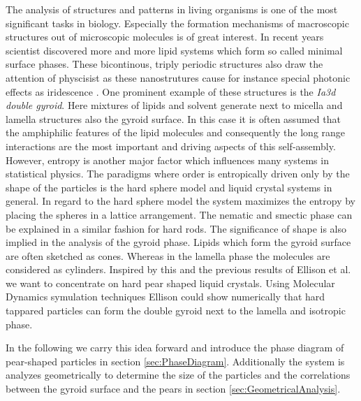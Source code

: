 \documentclass[epj,twocolumn]{webofc}
\begin{document}
The analysis of structures and patterns in living organisms is one of the most significant tasks in biology. Especially the formation mechanisms of macroscopic structures out of microscopic molecules is of great interest. In recent 
years scientist discovered more and more lipid systems which form so called minimal surface phases. These bicontinous, triply periodic structures also draw the attention of physcisist as these nanostrutures cause for instance special 
photonic effects as iridescence \cite{}. One prominent example of these structures is the \textit{Ia3d double gyroid}. Here mixtures of lipids and solvent generate next to micella and lamella structures also the gyroid surface.
In this case it is often assumed that the amphiphilic features of the lipid molecules and consequently the long range interactions are the most important and driving aspects of this self-assembly. However, entropy is another major 
factor which influences many systems in statistical physics. The paradigms where order is entropically driven only by the shape of the particles is the hard sphere model and liquid crystal systems in general. In regard to the hard 
sphere model the system maximizes the entropy by placing the spheres in a lattice arrangement. The nematic and smectic phase can be explained in a similar fashion for hard rods. The significance of shape is also implied in the analysis
of the gyroid phase. Lipids which form the gyroid surface are often sketched as cones. Whereas in the lamella phase the molecules are considered as cylinders. Inspired by this and the previous results of Ellison et al. \cite{} we want 
to concentrate on hard pear shaped liquid crystals. Using Molecular Dynamics symulation techniques Ellison could show numerically that hard tappared particles can form the double gyroid next to the lamella and isotropic phase. 

In the following we carry this idea forward and introduce the phase diagram of pear-shaped particles in section \ref{sec:PhaseDiagram}. Additionally the system is analyzes geometrically to determine the size of the particles and the 
correlations between the gyroid surface and the pears in section \ref{sec:GeometricalAnalysis}.
\end{document}
